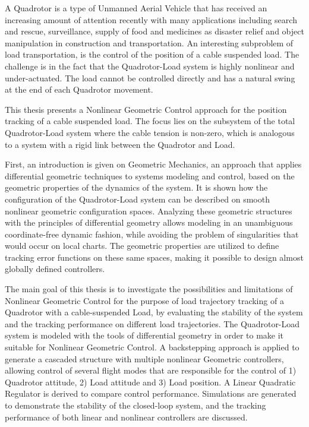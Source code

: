 \vspace{-2cm}
A Quadrotor is a type of Unmanned Aerial Vehicle that has received an increasing amount of attention recently with many applications including search and rescue, surveillance, supply of food and medicines as disaster relief and object manipulation in construction and transportation.
An interesting subproblem of load transportation, is the control of the position of a cable suspended load. The challenge is in the fact that the Quadrotor-Load system is highly nonlinear and under-actuated. The load cannot be controlled directly and has a natural swing at the end of each Quadrotor movement. 

This thesis presents a Nonlinear Geometric Control approach for the position tracking of a cable suspended load. 
The focus lies on the subsystem of the total Quadrotor-Load system where the cable tension is non-zero, which is analogous to a system with a rigid link between the Quadrotor and Load.

First, an introduction is given on Geometric Mechanics, an approach that applies differential geometric techniques to systems modeling and control, based on the geometric properties of the dynamics of the system. 
It is shown how the configuration of the Quadrotor-Load system can be described on smooth nonlinear geometric configuration spaces. Analyzing these geometric structures with the principles of differential geometry allows modeling in an unambiguous coordinate-free dynamic fashion, while avoiding the problem of singularities that would occur on local charts. The geometric properties are utilized to define tracking error functions on these same spaces, making it possible to design almost globally defined controllers.

The main goal of this thesis is to investigate the possibilities and limitations of Nonlinear Geometric Control for the purpose of load trajectory tracking of a Quadrotor with a cable-suspended Load, by evaluating the stability of the system and the tracking performance on different load trajectories. 
The Quadrotor-Load system is modeled with the tools of differential geometry in order to make it suitable for Nonlinear Geometric Control.
A backstepping approach is applied to generate a cascaded structure with multiple nonlinear Geometric controllers, allowing control of several flight modes that are responsible for the control of 1) Quadrotor attitude, 2) Load attitude and 3) Load position. 
A Linear Quadratic Regulator is derived to compare control performance. Simulations are generated to demonstrate the stability of the closed-loop system, and the tracking performance of both linear and nonlinear controllers are discussed. 

